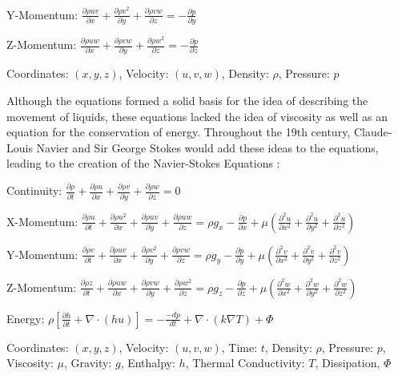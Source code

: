 \documentclass[12pt]{article}
\begin{document}
\begin{center}Y-Momentum: $\frac{\partial \rho uv}{\partial x} + \frac{\partial \rho v^2}{\partial y} + \frac{\partial \rho vw}{\partial z} = -\frac{\partial p}{\partial y}$\end{center}

\begin{center}Z-Momentum: $\frac{\partial \rho uw}{\partial x} + \frac{\partial \rho vw}{\partial y} + \frac{\partial \rho w^2}{\partial z} = -\frac{\partial p}{\partial z}$\end{center}

\begin{center} Coordinates: $(x,y,z)$, Velocity: $(u,v,w)$, Density: $\rho$, Pressure: $p$\end{center} 

Although the equations formed a solid basis for the idea of describing the movement of liquids, these equations lacked the idea of viscosity as well as an equation for the conservation of energy. Throughout the 19th century, Claude-Louis Navier and Sir George Stokes would add these ideas to the equations, leading to the creation of the Navier-Stokes Equations \cite{Navier}:
\begin{center}Continuity: $\frac{\partial \rho }{\partial t} + \frac{\partial \rho u}{\partial x} + \frac{\partial \rho v}{\partial y} + \frac{\partial \rho w}{\partial z} = 0$ \end{center}
\begin{center}X-Momentum: $\frac{\partial \rho u}{\partial t} + \frac{\partial \rho u^2}{\partial x} + \frac{\partial \rho uv}{\partial y} + \frac{\partial \rho uw}{\partial z} = \rho g_x - \frac{\partial p}{\partial x} + \mu(\frac{\partial^2 u}{\partial x^2}+\frac{\partial^2 u}{\partial y^2}+\frac{\partial^2 u}{\partial z^2})$\end{center}
\begin{center}Y-Momentum: $\frac{\partial \rho v}{\partial t} + \frac{\partial \rho uv}{\partial x} + \frac{\partial \rho v^2}{\partial y} + \frac{\partial \rho vw}{\partial z} = \rho g_y - \frac{\partial p}{\partial y} + \mu(\frac{\partial^2 v}{\partial x^2}+\frac{\partial^2 v}{\partial y^2}+\frac{\partial^2 v}{\partial z^2})$\end{center}
\begin{center}Z-Momentum: $\frac{\partial \rho z}{\partial t} + \frac{\partial \rho uw}{\partial x} + \frac{\partial \rho vw}{\partial y} + \frac{\partial \rho w^2}{\partial z} = \rho g_z - \frac{\partial p}{\partial z} + \mu(\frac{\partial^2 w}{\partial x^2}+\frac{\partial^2 w}{\partial y^2}+\frac{\partial^2 w}{\partial z^2})$\end{center}
\begin{center}Energy: $ \rho[\frac{\partial h}{\partial t}+ \nabla \cdot (hu)] = -\frac{-dp}{dt}+\nabla \cdot (k\nabla T)+\Phi$\end{center}
\begin{center}Coordinates: $(x,y,z)$, Velocity: $(u,v,w)$, Time: $t$, Density: $\rho$, Pressure: $p$, Viscosity: $\mu$, Gravity: $g$, Enthalpy: $h$, Thermal Conductivity: $T$, Dissipation, $\Phi$
\end{center}
\end{document}

